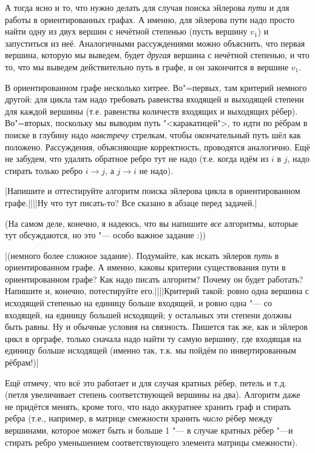 А тогда ясно и то, что нужно делать для случая поиска эйлерова \textit{пути} и для работы в 
ориентированных графах. А именно, для эйлерова пути надо просто найти одну из двух вершин с 
нечётной степенью (пусть вершину $v_1$) и запуститься из неё. Аналогичными рассуждениями можно 
объяснить, что первая вершина, которую мы выведем, будет \textit{другая} вершина с нечётной 
степенью, и что то, что мы выведем действительно путь в графе, и он закончится в вершине $v_1$.

В ориентированном графе несколько хитрее. Во"=первых, там критерий немного другой: для цикла там надо 
требовать равенства входящей и выходящей степени для каждой вершины (т.е. равенства количеств 
входящих и выходящих рёбер). Во"=вторых, поскольку мы выводим путь "<каракатицей">, то идти по рёбрам в поиске 
в глубину надо \textit{навстречу} стрелкам, чтобы окончательный путь шёл как положено. Рассуждения, 
объясняющие корректность, проводятся аналогично. Ещё не забудем, что удалять обратное ребро тут не 
надо (т.е. когда идём из $i$ в $j$, надо стирать только ребро $i\to j$, а $j\to i$ не надо).

\task|Напишите и оттестируйте алгоритм поиска эйлерова цикла в ориентированном графе.||||Ну что тут писать-то? Все сказано в абзаце перед задачей.|\label{directEuler}

(На самом деле, конечно, я надеюсь, что вы напишите \textit{все} алгоритмы, которые тут 
обсуждаются, но это "--- особо важное задание :))

\task|(немного более сложное задание). Подумайте, как искать эйлеров \emph{путь} в ориентированном 
графе. А именно, каковы критерии существования пути в ориентированном графе? Как надо писать 
алгоритм? Почему он будет работать? Напишите и, конечно, потестируйте его.||||Критерий такой: 
ровно одна вершина с исходящей степенью на единицу больше входящей,
и ровно одна "--- со входящей, на единицу большей исходящей; у остальных эти степени должны быть равны. 
Ну и обычные условия на связность. Пишется так же, как и эйлеров цикл в орграфе, только сначала надо найти ту самую вершину,
где входящая на единицу больше исходящей (именно так, т.к. мы пойдём по инвертированным рёбрам!)|\label{directEulerpath}

Ещё отмечу, что всё это работает и для случая кратных рёбер, петель и т.д. (петля увеличивает 
степень соответствующей вершины на два). Алгоритм даже не придётся менять, кроме того, что надо 
аккуратнее хранить граф и стирать ребра (т.е., например, в матрице смежности хранить \textit{число} 
рёбер между вершинами, которое может быть и больше 1 "--- в случае кратных рёбер "---и стирать 
ребро уменьшением соответствующего элемента матрицы смежности).

